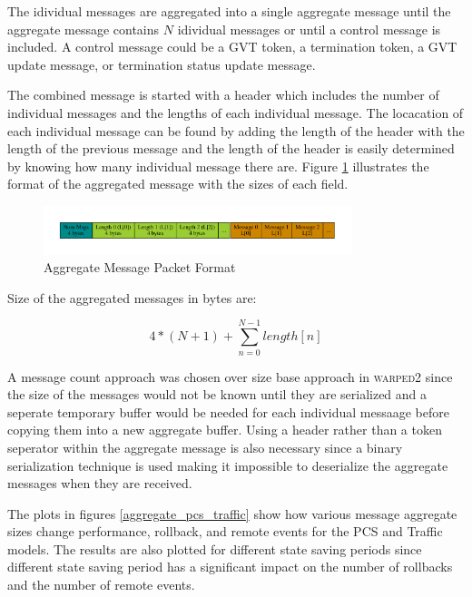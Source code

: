 \documentclass[11pt]{book}
\begin{document}
The idividual messages are aggregated into a single aggregate message until the aggregate message
contains $N$ idividual messages or until a control message is included.  A control message could be
a GVT token, a termination token, a GVT update message, or termination status update message.

The combined message is started with a header which includes the number of individual messages
and the lengths of each individual message.  The locacation of each individual message can be
found by adding the length of the header with the length of the previous message and the length
of the header is easily determined by knowing how many individual message there are.  Figure
\ref{aggregate_format} illustrates the format of the aggregated message with the sizes of each
field.

\begin{figure}
    \centering
    \includegraphics[width=0.8\textwidth,quiet]{figs/graphviz/aggregation_format.pdf}
    \caption{Aggregate Message Packet Format}\label{aggregate_format}
\end{figure}

Size of the aggregated messages in bytes are:

$$ 4 * (N + 1) + \sum_{n=0}^{N-1} length[n] $$

A message count approach was chosen over size base approach in \textsc{warped2} since the
size of the messages would not be known until they are serialized and a seperate temporary buffer
would be needed for each individual messaage before copying them into a new aggregate buffer.
Using a header rather than a token seperator within the aggregate message is also necessary
since a binary serialization technique is used making it impossible to deserialize the aggregate
messages when they are received.

The plots in figures \ref{aggregate_pcs_traffic} show how various message aggregate sizes change
performance, rollback, and remote events for the PCS and Traffic models.  The results are also
plotted for different state saving periods since different state saving period has a significant
impact on the number of rollbacks and the number of remote events.
\end{document}
